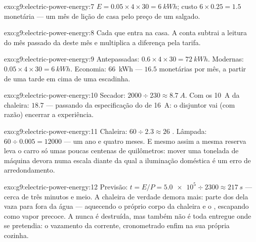 \begin{solution}{exo:g9:electric-power-energy:7}
$E = 0.05 \times 4 \times 30 = \qty{6}{kWh}$; custo
$6 \times 0.25 = 1.5$  monetária --- um mês de lição de casa
pelo preço de um salgado.
\end{solution}

\begin{solution}{exo:g9:electric-power-energy:8}
Cada  que entra na casa. A conta subtrai a leitura do
mês passado da deste mês e multiplica a diferença pela tarifa.
\end{solution}

\begin{solution}{exo:g9:electric-power-energy:9}
Antepassadas: $0.6 \times 4 \times 30 = \qty{72}{kWh}$. Modernas:
$0.05 \times 4 \times 30 = \qty{6}{kWh}$. Economia: \qty{66}{kWh} ---
$16.5$  monetárias por mês, a partir de uma tarde em cima de
uma escadinha.
\end{solution}

\begin{solution}{exo:g9:electric-power-energy:10}
Secador: $2000 \div 230 \approx \qty{8.7}{A}$. Com os \qty{10}{A} da
chaleira: $18.7$ --- passando da especificação do  de
\qty{16}{A}: o disjuntor vai (com razão) encerrar a experiência.
\end{solution}

\begin{solution}{exo:g9:electric-power-energy:11}
Chaleira: $60 \div 2.3 \approx 26$ . Lâmpada:
$60 \div 0.005 = 12000$  --- um ano e quatro meses. E mesmo
assim a mesma reserva leva o carro só umas poucas centenas de
quilômetros: mover uma tonelada de máquina devora  numa escala
diante da qual a iluminação doméstica é um erro de arredondamento.
\end{solution}

\begin{solution}{exo:g9:electric-power-energy:12}
Previsão: $t = E/P = \num{5.0e5} \div 2300 \approx \qty{217}{s}$ ---
cerca de três minutos e meio. A chaleira de verdade demora mais:
parte dos  dela vaza para fora da água --- aquecendo o próprio
corpo da chaleira e o , escapando como vapor precoce. A 
nunca é destruída, mas também não é toda entregue onde se pretendia:
o vazamento da corrente, cronometrado enfim na sua própria cozinha.
\end{solution}

